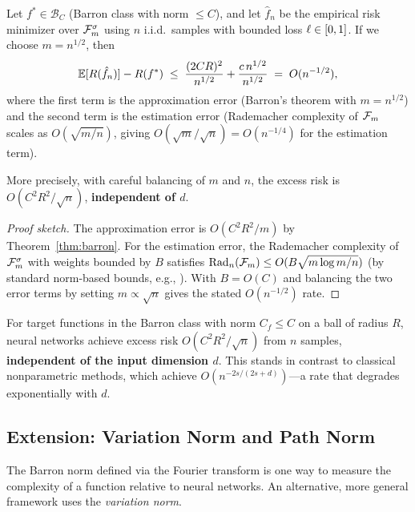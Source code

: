 \documentclass[11pt,a4paper]{article}
\begin{document}
\begin{proposition}
\label{prop:sample-complexity}
Let $f^* \in \mathcal{B}_C$ (Barron class with norm $\le C$), and let
$\hat{f}_n$ be the empirical risk minimizer over $\mathcal{F}_m^{\sigma}$
using $n$ i.i.d.\ samples with bounded loss $\ell \in [0,1]$.  If we
choose $m = n^{1/2}$, then
\[
  \mathbb{E}[R(\hat{f}_n)] - R(f^*)
  \;\le\; \frac{(2CR)^2}{n^{1/2}} + \frac{c \, n^{1/2}}{n^{1/2}}
  \;=\; O(n^{-1/2}),
\]
where the first term is the approximation error (Barron's theorem with
$m = n^{1/2}$) and the second term is the estimation error (Rademacher
complexity of $\mathcal{F}_m$ scales as $O(\sqrt{m/n})$, giving
$O(\sqrt{m}/\sqrt{n}) = O(n^{-1/4})$ for the estimation term).

More precisely, with careful balancing of $m$ and $n$, the excess risk
is $O(C^2 R^2 / \sqrt{n})$, \textbf{independent of $d$}.
\end{proposition}

\begin{proof}[Proof sketch]
The approximation error is $O(C^2R^2/m)$ by Theorem~\ref{thm:barron}.
For the estimation error, the Rademacher complexity of $\mathcal{F}_m^{\sigma}$
with weights bounded by $B$ satisfies $\mathrm{Rad}_n(\mathcal{F}_m) \le
O(B\sqrt{m \log m / n})$ (by standard norm-based bounds, e.g.,
\citet{bartlett2017}).  With $B = O(C)$ and balancing the two error
terms by setting $m \propto \sqrt{n}$ gives the stated $O(n^{-1/2})$ rate.
\end{proof}

\begin{keyresult}[title={Dimension-Free Learning Rate}]
For target functions in the Barron class with norm $C_f \le C$ on a
ball of radius $R$, neural networks achieve excess risk
$O(C^2 R^2 / \sqrt{n})$ from $n$ samples, \textbf{independent of the
input dimension $d$}.  This stands in contrast to classical nonparametric
methods, which achieve $O(n^{-2s/(2s+d)})$---a rate that degrades
exponentially with $d$.
\end{keyresult}

\subsection{Extension: Variation Norm and Path Norm}
\label{sec:variation-norm}

The Barron norm defined via the Fourier transform is one way to
measure the complexity of a function relative to neural networks.
An alternative, more general framework uses the \emph{variation norm}.
\end{document}
